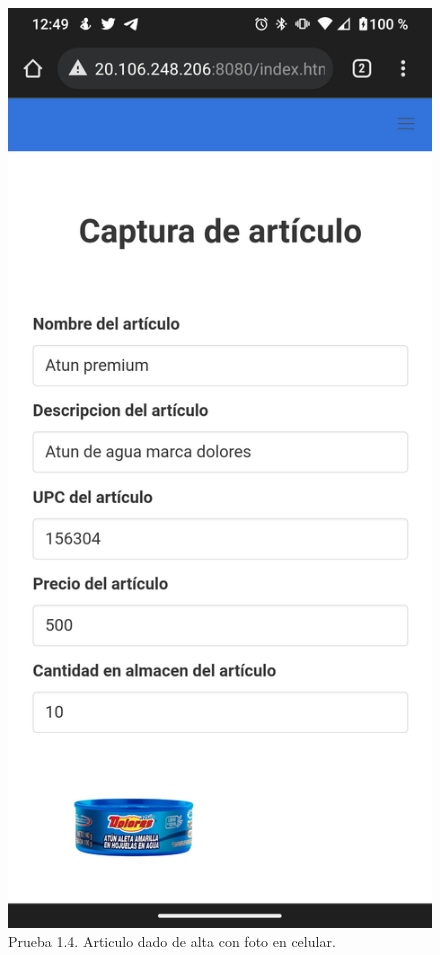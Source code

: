 \documentclass[11pt]{article}
\begin{document}
		\begin{figure}[H]
			\centering
			\includegraphics[scale=0.27]{resources/Screenshot_20211113-004906.png}
			\caption{Prueba 1.4. Articulo dado de alta con foto en celular.}\label{fig:picture}
		\end{figure}
\end{document}
